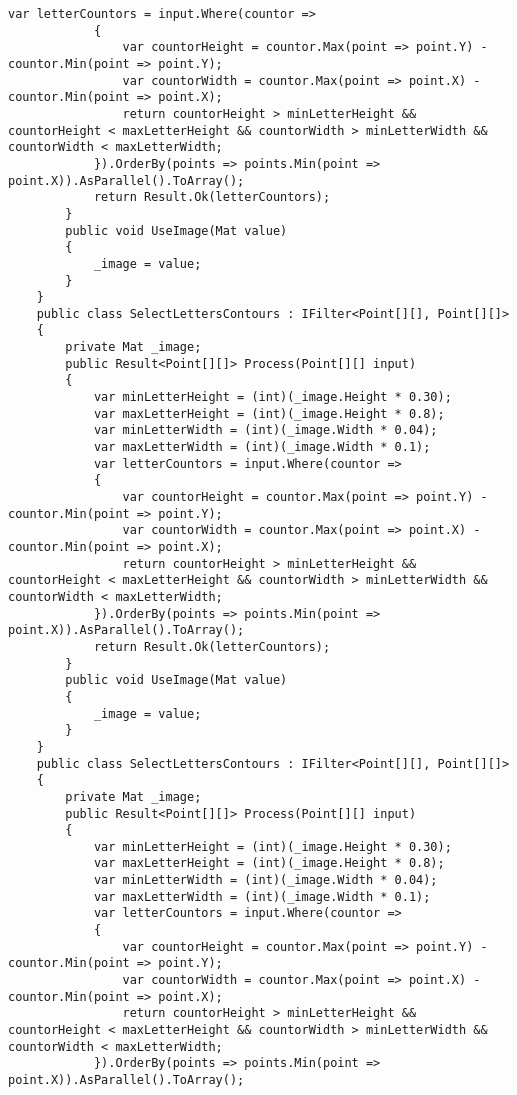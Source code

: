 \begin{lstlisting}[style=fsharpstyle,caption={Исходный код}, label=lst:recognition_result_handler]
            var letterCountors = input.Where(countor =>
            {
                var countorHeight = countor.Max(point => point.Y) - countor.Min(point => point.Y);
                var countorWidth = countor.Max(point => point.X) - countor.Min(point => point.X);
                return countorHeight > minLetterHeight && countorHeight < maxLetterHeight && countorWidth > minLetterWidth && countorWidth < maxLetterWidth;
            }).OrderBy(points => points.Min(point => point.X)).AsParallel().ToArray();
            return Result.Ok(letterCountors);
        }
        public void UseImage(Mat value)
        {
            _image = value;
        }
    }
    public class SelectLettersContours : IFilter<Point[][], Point[][]>
    {
        private Mat _image;
        public Result<Point[][]> Process(Point[][] input)
        {
            var minLetterHeight = (int)(_image.Height * 0.30);
            var maxLetterHeight = (int)(_image.Height * 0.8);
            var minLetterWidth = (int)(_image.Width * 0.04);
            var maxLetterWidth = (int)(_image.Width * 0.1);
            var letterCountors = input.Where(countor =>
            {
                var countorHeight = countor.Max(point => point.Y) - countor.Min(point => point.Y);
                var countorWidth = countor.Max(point => point.X) - countor.Min(point => point.X);
                return countorHeight > minLetterHeight && countorHeight < maxLetterHeight && countorWidth > minLetterWidth && countorWidth < maxLetterWidth;
            }).OrderBy(points => points.Min(point => point.X)).AsParallel().ToArray();
            return Result.Ok(letterCountors);
        }
        public void UseImage(Mat value)
        {
            _image = value;
        }
    }
    public class SelectLettersContours : IFilter<Point[][], Point[][]>
    {
        private Mat _image;
        public Result<Point[][]> Process(Point[][] input)
        {
            var minLetterHeight = (int)(_image.Height * 0.30);
            var maxLetterHeight = (int)(_image.Height * 0.8);
            var minLetterWidth = (int)(_image.Width * 0.04);
            var maxLetterWidth = (int)(_image.Width * 0.1);
            var letterCountors = input.Where(countor =>
            {
                var countorHeight = countor.Max(point => point.Y) - countor.Min(point => point.Y);
                var countorWidth = countor.Max(point => point.X) - countor.Min(point => point.X);
                return countorHeight > minLetterHeight && countorHeight < maxLetterHeight && countorWidth > minLetterWidth && countorWidth < maxLetterWidth;
            }).OrderBy(points => points.Min(point => point.X)).AsParallel().ToArray();

\end{lstlisting}
